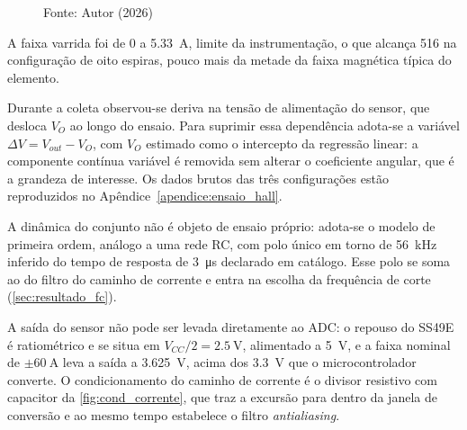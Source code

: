 \begin{figure}[H]

    Fonte: Autor (2026)
\end{figure}

A faixa varrida foi de 0 a \SI{5,33}{\ampere}, limite da instrumentação, o
que alcança \SI{516}{\gauss} na configuração de oito espiras, pouco mais
da metade da faixa magnética típica do elemento.

Durante a coleta observou-se deriva na tensão de alimentação do sensor, que
desloca $V_O$ ao longo do ensaio. Para suprimir essa dependência adota-se a
variável $\Delta V = V_{out} - V_O$, com $V_O$ estimado como o intercepto da
regressão linear: a componente contínua variável é removida sem alterar o
coeficiente angular, que é a grandeza de interesse. Os dados brutos das três
configurações estão reproduzidos no Apêndice~\ref{apendice:ensaio_hall}.

A dinâmica do conjunto não é objeto de ensaio próprio: adota-se o modelo de
primeira ordem, análogo a uma rede RC, com polo único em torno de
\SI{56}{\kilo\hertz} inferido do tempo de resposta de
\SI{3}{\micro\second} declarado em catálogo. Esse polo se soma ao do filtro do
caminho de corrente e entra na escolha da frequência de corte
(\autoref{sec:resultado_fc}).

A saída do sensor não pode ser levada diretamente ao ADC: o repouso do SS49E é
ratiométrico e se situa em $V_{CC}/2 = \SI{2,5}{\volt}$, alimentado a
\SI{5}{\volt}, e a faixa nominal de $\pm\SI{60}{\ampere}$ leva a saída a
\SI{3,625}{\volt}, acima dos \SI{3,3}{\volt} que o microcontrolador converte. O
condicionamento do caminho de corrente é o divisor resistivo com capacitor da
\autoref{fig:cond_corrente}, que traz a excursão para dentro da janela de
conversão e ao mesmo tempo estabelece o filtro \textit{antialiasing}.

